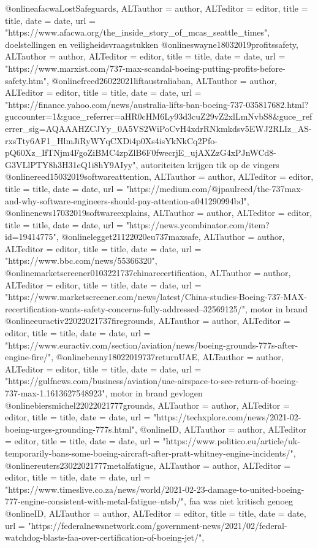 {{{{{{{{{{{{{{@online{afacwaLostSafeguards,	ALTauthor = {author},	ALTeditor = {editor},	title = {title},	date = {date},	url = {"https://www.afacwa.org/the_inside_story_of_mcas_seattle_times"},}
doelstellingen en veiligheidsvraagstukken
@online{swayne18032019profitssafety,	ALTauthor = {author},	ALTeditor = {editor},	title = {title},	date = {date},	url = {"https://www.marxist.com/737-max-scandal-boeing-putting-profits-before-safety.htm"},}
@online{freed26022021liftaustraliaban,	ALTauthor = {author},	ALTeditor = {editor},	title = {title},	date = {date},	url = {"https://finance.yahoo.com/news/australia-lifts-ban-boeing-737-035817682.html?guccounter=1&guce_referrer=aHR0cHM6Ly93d3cuZ29vZ2xlLmNvbS8&guce_referrer_sig=AQAAAHZCJYy_0A5VS2WiPoCvH4xdrRNkmkdsv5EWJ2RLIz_AS-rxsTty6AF1_HlmJiRyWYqCXDi4p0Xs4isYkNkCq2Pfo-pQ60Xz_IfTNjm4FgoZiBMC4zpZlB6F0fwecrjE_ujAXZzG4xPJnWCd8-G3VLlPTY8h3H31eQ1i8hY9AIyy"},}
autoriteiten krijgen tik op de vingers
@online{reed15032019softwareattention,	ALTauthor = {author},	ALTeditor = {editor},	title = {title},	date = {date},	url = {"https://medium.com/@jpaulreed/the-737max-and-why-software-engineers-should-pay-attention-a041290994bd"},}
@online{news17032019softwareexplains,	ALTauthor = {author},	ALTeditor = {editor},	title = {title},	date = {date},	url = {"https://news.ycombinator.com/item?id=19414775"},}
@online{legget21122020eu737maxsafe,	ALTauthor = {author},	ALTeditor = {editor},	title = {title},	date = {date},	url = {"https://www.bbc.com/news/55366320"},}
@online{marketscreener0103221737chinarecertification,	ALTauthor = {author},	ALTeditor = {editor},	title = {title},	date = {date},	url = {"https://www.marketscreener.com/news/latest/China-studies-Boeing-737-MAX-recertification-wants-safety-concerns-fully-addressed--32569125/"},}
motor in brand
@online{euractiv22022021737firegrounds,	ALTauthor = {author},	ALTeditor = {editor},	title = {title},	date = {date},	url = {"https://www.euractiv.com/section/aviation/news/boeing-grounds-777s-after-engine-fire/"},}
@online{benny18022019737returnUAE,	ALTauthor = {author},	ALTeditor = {editor},	title = {title},	date = {date},	url = {"https://gulfnews.com/business/aviation/uae-airspace-to-see-return-of-boeing-737-max-1.1613627548923"},}
motor in brand gevlogen
@online{biersmichel22022021777grounds,	ALTauthor = {author},	ALTeditor = {editor},	title = {title},	date = {date},	url = {"https://techxplore.com/news/2021-02-boeing-urges-grounding-777s.html"},}
@online{ID,	ALTauthor = {author},	ALTeditor = {editor},	title = {title},	date = {date},	url = {"https://www.politico.eu/article/uk-temporarily-bans-some-boeing-aircraft-after-pratt-whitney-engine-incidents/"},}
@online{reuters23022021777metalfatigue,	ALTauthor = {author},	ALTeditor = {editor},	title = {title},	date = {date},	url = {"https://www.timeslive.co.za/news/world/2021-02-23-damage-to-united-boeing-777-engine-consistent-with-metal-fatigue--ntsb/"},}
faa was niet kritisch genoeg
@online{ID,	ALTauthor = {author},	ALTeditor = {editor},	title = {title},	date = {date},	url = {"https://federalnewsnetwork.com/government-news/2021/02/federal-watchdog-blasts-faa-over-certification-of-boeing-jet/"},}


}}}}}}}}}}}}}}
